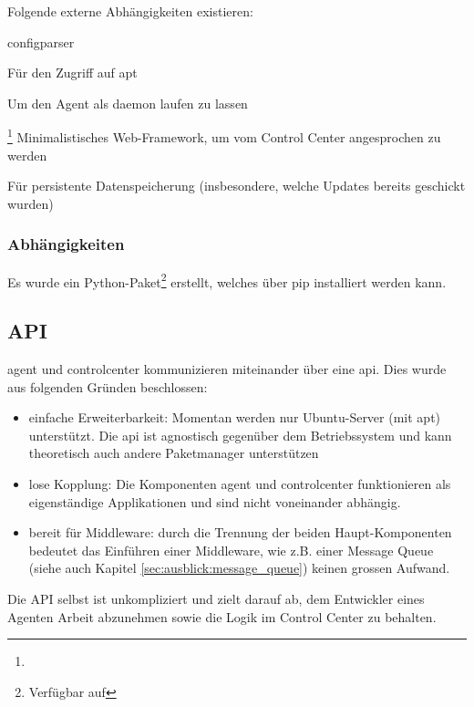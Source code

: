 Folgende externe Abhängigkeiten existieren:

\begin{labeling}{configparser}
    \item [apt] Für den Zugriff auf \gls{apt}
    \item [daemonize] Um den Agent als \gls{daemon} laufen zu lassen
    \item [configparser]
    \item [bottle]\footnote{} Minimalistisches Web-Framework, um vom Control Center angesprochen zu werden
    \item [shelve] Für persistente Datenspeicherung (insbesondere, welche Updates bereits geschickt wurden)
\end{labeling}

\subsubsection*{Abhängigkeiten}

Es wurde ein Python-Paket\footnote{Verfügbar auf } erstellt, welches über \gls{pip} installiert werden kann.

\subsection*{API}
\label{sec:architecture:api}

\gls{agent} und \gls{controlcenter} kommunizieren miteinander über eine \gls{api}. Dies wurde aus folgenden Gründen beschlossen:

\begin{itemize}
    \item einfache Erweiterbarkeit: Momentan werden nur Ubuntu-Server (mit \gls{apt}) unterstützt. Die \gls{api} ist agnostisch gegenüber dem Betriebssystem und kann theoretisch auch andere Paketmanager unterstützen
    \item lose Kopplung: Die Komponenten \gls{agent} und \gls{controlcenter} funktionieren als eigenständige Applikationen und sind nicht voneinander abhängig.
    \item bereit für Middleware: durch die Trennung der beiden Haupt-Komponenten bedeutet das Einführen einer Middleware, wie z.B. einer Message Queue (siehe auch Kapitel \ref{sec:ausblick:message_queue}) keinen grossen Aufwand.
\end{itemize}

Die API selbst ist unkompliziert und zielt darauf ab, dem Entwickler eines Agenten Arbeit abzunehmen sowie die Logik im Control Center zu behalten.

